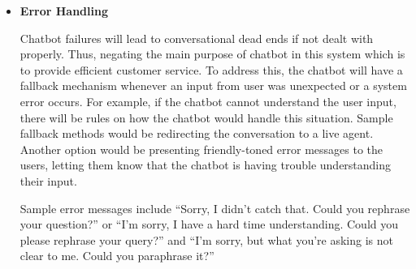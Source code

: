 \begin{itemize}
	\item \textbf{Error Handling}
	
	Chatbot failures will lead to conversational dead ends if not dealt with properly. Thus, negating the main purpose of chatbot in this system which is to provide efficient customer service. To address this, the chatbot will have a fallback mechanism whenever an input from user was unexpected or a system error occurs. For example, if the chatbot cannot understand the user input, there will be rules on how the chatbot would handle this situation. Sample fallback methods would be redirecting the conversation to a live agent. Another option would be presenting friendly-toned error messages to the users, letting them know that the chatbot is having trouble understanding their input.
	
	Sample error messages include “Sorry, I didn't catch that. Could you rephrase your question?” or “I'm sorry, I have a hard time understanding. Could you please rephrase your query?” and “I'm sorry, but what you're asking is not clear to me. Could you paraphrase it?”
	
\end{itemize}

